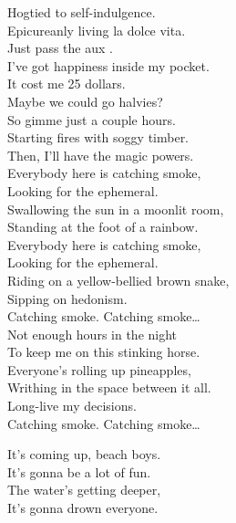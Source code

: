Hogtied to self-indulgence. \\
Epicureanly living la dolce vita. \\
Just pass the aux . \\

I've got happiness inside my pocket. \\
It cost me 25 dollars. \\
Maybe we could go halvies? \\
So gimme just a couple hours. \\
Starting fires with soggy timber. \\
Then, I'll have the magic powers. \\

Everybody here is catching smoke, \\
Looking for the ephemeral. \\
Swallowing the sun in a moonlit room, \\
Standing at the foot of a rainbow. \\
Everybody here is catching smoke, \\
Looking for the ephemeral. \\
Riding on a yellow-bellied brown snake, \\
Sipping on hedonism. \\

Catching smoke. Catching smoke… \\

Not enough hours in the night \\
To keep me on this stinking horse. \\
Everyone's rolling up pineapples, \\
Writhing in the space between it all. \\
Long-live my decisions. \\

Catching smoke. Catching smoke… \\





It's coming up, beach boys. \\
It's gonna be a lot of fun. \\
The water's getting deeper, \\
It's gonna drown everyone. \\

